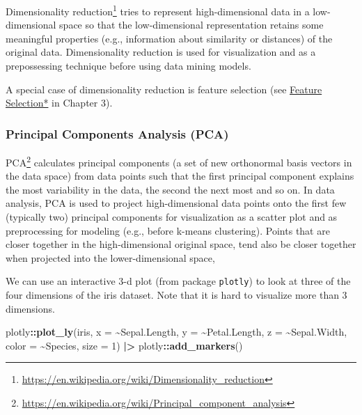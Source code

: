 \documentclass[
  notitlepage]{book}
\newenvironment{Shaded}{\begin{snugshade}}{\end{snugshade}}
\newcommand{\DataTypeTok}[1]{\textcolor[rgb]{0.13,0.29,0.53}{#1}}
\newcommand{\DecValTok}[1]{\textcolor[rgb]{0.00,0.00,0.81}{#1}}
\newcommand{\ErrorTok}[1]{\textcolor[rgb]{0.64,0.00,0.00}{\textbf{#1}}}
\newcommand{\KeywordTok}[1]{\textcolor[rgb]{0.13,0.29,0.53}{\textbf{#1}}}
\newcommand{\NormalTok}[1]{#1}
\newcommand{\OperatorTok}[1]{\textcolor[rgb]{0.81,0.36,0.00}{\textbf{#1}}}
\newcommand{\StringTok}[1]{\textcolor[rgb]{0.31,0.60,0.02}{#1}}
\DeclareRobustCommand{\href}[2]{#2\footnote{\url{#1}}}
\begin{document}
\href{https://en.wikipedia.org/wiki/Dimensionality_reduction}{Dimensionality reduction}
tries to represent high-dimensional data in a low-dimensional space so that the
low-dimensional representation retains some meaningful properties (e.g., information about similarity or distances) of the original data. Dimensionality reduction is
used for visualization and as a prepossessing technique before using data mining
models.

A special case of dimensionality reduction is feature selection (see
\protect\hyperlink{feature-selection}{Feature Selection*} in Chapter 3).

\hypertarget{principal-components-analysis-pca}{%
\subsubsection{Principal Components Analysis (PCA)}\label{principal-components-analysis-pca}}

\href{https://en.wikipedia.org/wiki/Principal_component_analysis}{PCA}
calculates principal components (a set of new orthonormal basis vectors
in the data space) from data points such that the first principal
component explains the most variability in the data, the second the next
most and so on. In data analysis, PCA is used to project
high-dimensional data points onto the first few (typically two)
principal components for visualization as a scatter plot and as
preprocessing for modeling (e.g., before k-means clustering). Points
that are closer together in the high-dimensional original space, tend
also be closer together when projected into the lower-dimensional space,

We can use an interactive 3-d plot (from package \texttt{plotly}) to look at
three of the four dimensions of the iris dataset. Note that it is hard
to visualize more than 3 dimensions.

\begin{Shaded}
\begin{Highlighting}[]
\NormalTok{plotly}\OperatorTok{::}\KeywordTok{plot\_ly}\NormalTok{(iris, }
                \DataTypeTok{x =} \OperatorTok{\textasciitilde{}}\NormalTok{Sepal.Length, }
                \DataTypeTok{y =} \OperatorTok{\textasciitilde{}}\NormalTok{Petal.Length, }
                \DataTypeTok{z =} \OperatorTok{\textasciitilde{}}\NormalTok{Sepal.Width, }
      \DataTypeTok{color =} \OperatorTok{\textasciitilde{}}\NormalTok{Species, }\DataTypeTok{size =} \DecValTok{1}\NormalTok{) }\OperatorTok{|}\ErrorTok{\textgreater{}}\StringTok{ }
\StringTok{  }\NormalTok{plotly}\OperatorTok{::}\KeywordTok{add\_markers}\NormalTok{()}
\end{Highlighting}
\end{Shaded}
\end{document}

